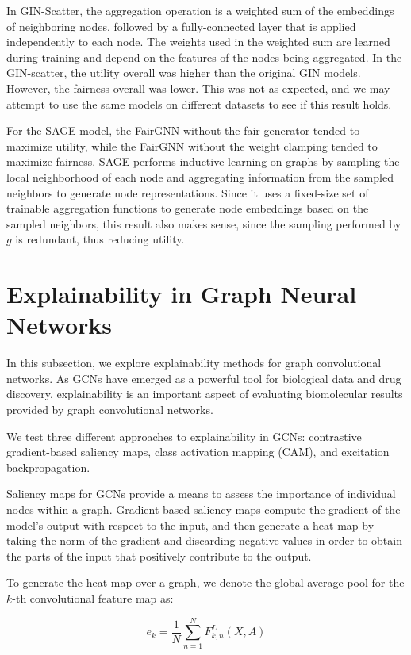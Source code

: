 \documentclass[final]{article}
\begin{document}
In GIN-Scatter, the aggregation operation is a weighted sum of the embeddings of neighboring nodes, followed by a fully-connected layer that is applied independently to each node. The weights used in the weighted sum are learned during training and depend on the features of the nodes being aggregated. In the GIN-scatter, the utility overall was higher than the original GIN models. However, the fairness overall was lower. 
This was not as expected, and we may attempt to use the same models on different datasets to see if this result holds. 


 For the SAGE model, the FairGNN without the fair generator tended to maximize utility, while the FairGNN without the weight clamping tended to maximize fairness. SAGE performs inductive learning on graphs by sampling the local neighborhood of each node and aggregating information from the sampled neighbors to generate node representations. Since it uses a fixed-size set of trainable aggregation functions to generate node embeddings based on the sampled neighbors, this result also makes sense, since the sampling performed by $g$ is redundant, thus reducing utility.

\newpage 

\section{Explainability in Graph Neural Networks} 
In this subsection, we explore explainability methods for graph convolutional networks. As GCNs have emerged as a powerful tool for biological data and drug discovery, explainability is an important aspect of evaluating biomolecular results provided by graph convolutional networks. 

We test three different approaches to explainability in GCNs: contrastive gradient-based saliency maps, class activation mapping (CAM), and excitation backpropagation.  

Saliency maps for GCNs provide a means to assess the importance of individual nodes within a graph. Gradient-based saliency maps compute the gradient of the model's output with respect to the input, and then generate a heat map by taking the norm of the gradient and discarding negative values in order to obtain the parts of the input that positively contribute to the output. \cite{8954227}

To generate the heat map over a graph, we denote the global average pool for the $k$-th convolutional feature map as: 

$$e_k = \frac{1}{N}\sum_{n=1}^{N} F_{k, n}^L(X, A)$$
\end{document}
